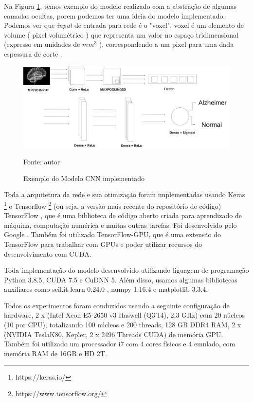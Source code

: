 \documentclass[openright]{UFRGS} %
\begin{document}
Na Figura  \ref{fig:cnnmodel}, temos  exemplo do modelo realizado com a abstração de algumas camadas ocultas, porem podemos ter uma ideia do modelo implementado. 
Podemos ver  que \textit{input} de entrada para rede é o "voxel". voxel é um elemento de volume ( pixel volumétrico ) que representa um valor no espaço tridimensional (expresso em unidades de  ${mm^3}$ ), correspondendo a um pixel para uma dada espessura de corte \cite{watkins2001structural}.

\begin{figure}[h]
    \centering
    \caption{Exemplo do Modelo CNN implementado}
    \includegraphics[scale=0.20]{cnn3d.png}
    \centerline{Fonte: autor}
    \label{fig:cnnmodel}
\end{figure}



Toda a arquitetura da rede e sua otimização foram implementadas usando Keras \footnote[1]{https://keras.io/}  e  Tensorflow \footnote[2]{https://www.tensorflow.org/}  (ou seja, a versão mais recente do repositório de código) TensorFlow  , que é uma biblioteca de código aberto criada para aprendizado de máquina, computação numérica e muitas outras tarefas. Foi desenvolvido pelo Google \cite{abadi2016tensorflow}. Também  foi utilizado  TensorFlow-GPU, que é uma extensão do TensorFlow para trabalhar com GPUs e poder utilizar  recursos do desenvolvimento com CUDA. 

Toda implementação do modelo desenvolvido utilizando liguagem de programação Python 3.8.5, CUDA 7.5 e CuDNN 5. Além disso, usamos algumas bibliotecas auxiliares como scikit-learn 0.24.0 , numpy 1.16.4 e matplotlib 3.3.4. 



Todos os experimentos foram conduzidos usando a seguinte configuração de hardware, 2 x (Intel Xeon E5-2650 v3 Haswell (Q3'14), 2,3 GHz) com 20 núcleos (10 por CPU), totalizando 100 núcleos e 200 threads, 128 GB DDR4 RAM, 2 x (NVIDIA TeslaK80, Kepler, 2 x 2496 Threads CUDA) de memória GPU.  Também foi utilizado um processador i7 com 4 cores físicos e 4 emulado, com memória RAM de 16GB e HD 2T.
\end{document}
